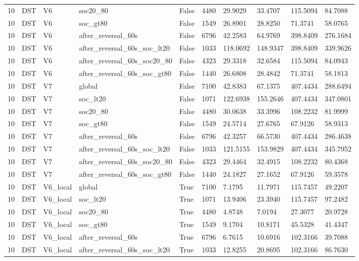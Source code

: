 \begin{tabular}{llllllllll}
10 & DST & V6 & soc20\_80 & False & 4480 & 29.9029 & 33.4707 & 115.5094 & 84.7088 \\
10 & DST & V6 & soc\_gt80 & False & 1549 & 26.8901 & 28.8250 & 71.3741 & 58.0765 \\
10 & DST & V6 & after\_reversal\_60s & False & 6796 & 42.2583 & 64.9769 & 398.8409 & 276.1684 \\
10 & DST & V6 & after\_reversal\_60s\_soc\_lt20 & False & 1033 & 118.0692 & 148.9347 & 398.8409 & 339.9626 \\
10 & DST & V6 & after\_reversal\_60s\_soc20\_80 & False & 4323 & 29.3318 & 32.6584 & 115.5094 & 84.0943 \\
10 & DST & V6 & after\_reversal\_60s\_soc\_gt80 & False & 1440 & 26.6808 & 28.4842 & 71.3741 & 58.1813 \\
10 & DST & V7 & global & False & 7100 & 42.8383 & 67.1375 & 407.4434 & 288.6494 \\
10 & DST & V7 & soc\_lt20 & False & 1071 & 122.6938 & 155.2646 & 407.4434 & 347.0801 \\
10 & DST & V7 & soc20\_80 & False & 4480 & 30.0638 & 33.3996 & 108.2232 & 81.9999 \\
10 & DST & V7 & soc\_gt80 & False & 1549 & 24.5714 & 27.6765 & 67.9126 & 58.9313 \\
10 & DST & V7 & after\_reversal\_60s & False & 6796 & 42.3257 & 66.5730 & 407.4434 & 286.4638 \\
10 & DST & V7 & after\_reversal\_60s\_soc\_lt20 & False & 1033 & 121.5155 & 153.9829 & 407.4434 & 345.7952 \\
10 & DST & V7 & after\_reversal\_60s\_soc20\_80 & False & 4323 & 29.4464 & 32.4915 & 108.2232 & 80.4368 \\
10 & DST & V7 & after\_reversal\_60s\_soc\_gt80 & False & 1440 & 24.1827 & 27.1652 & 67.9126 & 59.3578 \\
10 & DST & V6\_local & global & True & 7100 & 7.1795 & 11.7971 & 115.7457 & 49.2207 \\
10 & DST & V6\_local & soc\_lt20 & True & 1071 & 13.9406 & 23.3940 & 115.7457 & 97.2482 \\
10 & DST & V6\_local & soc20\_80 & True & 4480 & 4.8748 & 7.0194 & 27.3077 & 20.9728 \\
10 & DST & V6\_local & soc\_gt80 & True & 1549 & 9.1704 & 10.8171 & 45.5328 & 41.4347 \\
10 & DST & V6\_local & after\_reversal\_60s & True & 6796 & 6.7615 & 10.6916 & 102.3166 & 39.7088 \\
10 & DST & V6\_local & after\_reversal\_60s\_soc\_lt20 & True & 1033 & 12.8255 & 20.8695 & 102.3166 & 86.7630 \\

\end{tabular}
